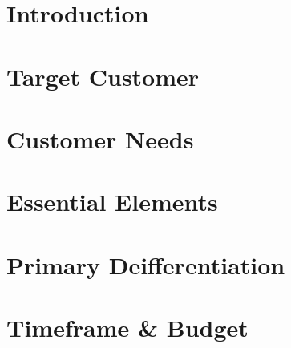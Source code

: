 \documentclass{article}
\begin{document}
	\section{Introduction}
	
	 \section{Target Customer}
	 
	 \section{Customer Needs}
	 
	 \section{Essential Elements} 
	 
	 \section{Primary Deifferentiation} 
	 
	 \newpage
	 \section{Timeframe \& Budget} %
	 
	           
	
\end{document}
